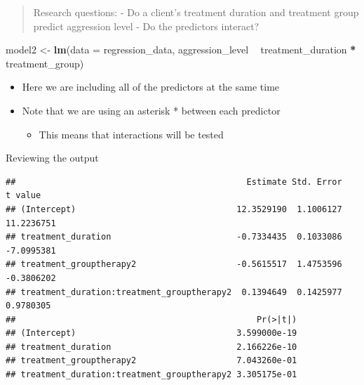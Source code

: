 \documentclass[
]{book}
\newenvironment{Shaded}{\begin{snugshade}}{\end{snugshade}}
\newcommand{\DataTypeTok}[1]{\textcolor[rgb]{0.13,0.29,0.53}{#1}}
\newcommand{\KeywordTok}[1]{\textcolor[rgb]{0.13,0.29,0.53}{\textbf{#1}}}
\newcommand{\NormalTok}[1]{#1}
\newcommand{\OperatorTok}[1]{\textcolor[rgb]{0.81,0.36,0.00}{\textbf{#1}}}
\newcommand{\StringTok}[1]{\textcolor[rgb]{0.31,0.60,0.02}{#1}}
\providecommand{\tightlist}{%
  \setlength{\itemsep}{0pt}\setlength{\parskip}{0pt}}
\begin{document}
\begin{quote}
Research questions:
- Do a client's treatment duration and treatment group predict aggression level
- Do the predictors interact?
\end{quote}

\begin{Shaded}
\begin{Highlighting}[]
\NormalTok{model2 <-}\StringTok{ }\KeywordTok{lm}\NormalTok{(}\DataTypeTok{data =}\NormalTok{ regression_data, aggression_level }\OperatorTok{~}\StringTok{ }\NormalTok{treatment_duration }\OperatorTok{*}\StringTok{ }\NormalTok{treatment_group)}
\end{Highlighting}
\end{Shaded}

\begin{itemize}
\tightlist
\item
  Here we are including all of the predictors at the same time
\item
  Note that we are using an asterisk * between each predictor

  \begin{itemize}
  \tightlist
  \item
    This means that interactions will be tested
  \end{itemize}
\end{itemize}

Reviewing the output

\begin{Shaded}
\end{Shaded}

\begin{verbatim}
##                                              Estimate Std. Error    t value
## (Intercept)                                12.3529190  1.1006127 11.2236751
## treatment_duration                         -0.7334435  0.1033086 -7.0995381
## treatment_grouptherapy2                    -0.5615517  1.4753596 -0.3806202
## treatment_duration:treatment_grouptherapy2  0.1394649  0.1425977  0.9780305
##                                                Pr(>|t|)
## (Intercept)                                3.599000e-19
## treatment_duration                         2.166226e-10
## treatment_grouptherapy2                    7.043260e-01
## treatment_duration:treatment_grouptherapy2 3.305175e-01
\end{verbatim}
\end{document}
